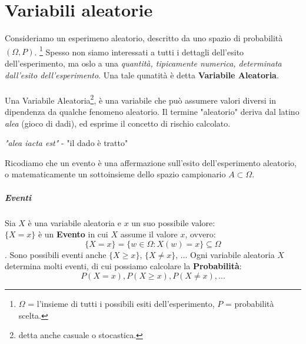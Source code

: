 \chapter{Variabili aleatorie}
Consideriamo un esperimeno aleatorio, descritto da uno spazio di probabilità $(\Omega, P)$.
\footnote{$\Omega$ = l'insieme di tutti i possibili esiti dell'esperimento, $P$ = probabilità scelta.}
Spesso non siamo interessati a tutti i dettagli dell'esito dell'esperimento, ma oslo a una \emph{quantità, tipicamente numerica, determinata dall'esito dell'esperimento}.
Una tale qunatità è detta \textbf{Variabile Aleatoria}.
\\\\Una Variabile Aleatoria\footnote{detta anche casuale o stocastica.}, è una variabile che può assumere valori diversi in dipendenza da qualche fenomeno aleatorio.
Il termine "aleatorio" deriva dal latino \textit{alea} (gioco di dadi), ed esprime il
concetto di rischio calcolato.
\begin{center}
	\textit{"alea iacta est"} - "il dado è tratto"
\end{center}

Ricodiamo che un evento è una affermazione sull'esito dell'esperimento aleatorio, o matematicamente un
sottoinsieme dello spazio campionario $A \subset \Omega$.

\paragraph{Eventi} Sia $X$ è una variabile aleatoria e $x$ un suo possibile valore:
\\$\{X = x\}$ è un \textbf{Evento} in cui $X$ assume il valore $x$, ovvero:
\[\{X = x\}= \{w \in \Omega: X(w) = x\} \subseteq \Omega\].
Sono possibili eventi anche $\{X \geq x\}$, $\{X \neq x\}$, ...
Ogni variabile aleatoria $X$ determina molti eventi, di cui possiamo calcolare la \textbf{Probabilità}:
\[P(X=x), P(X\geq x), P(X\neq x), ...\]

